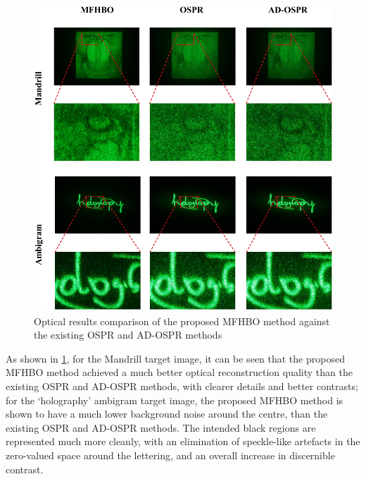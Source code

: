 	\begin{figure}[H]
		\centering
		\includegraphics[width=1.0\textwidth]{recon_quality_vs_OSPR_ADOSPR.pdf}
		\caption{Optical results comparison of the proposed MFHBO method against the existing OSPR and AD-OSPR methods}
		\label{fig:recon_quality_vs_OSPR_ADOSPR}
	\end{figure}

	As shown in \cref{fig:recon_quality_vs_OSPR_ADOSPR}, for the Mandrill target image, it can be seen that the proposed MFHBO method achieved a much better optical reconstruction quality than the existing OSPR and AD-OSPR methods, with clearer details and better contrasts; for the `holography' ambigram target image, the proposed MFHBO method is shown to have a much lower background noise around the centre, than the existing OSPR and AD-OSPR methods. The intended black regions are represented much more cleanly, with an elimination of speckle-like artefacts in the zero-valued space around the lettering, and an overall increase in discernible contrast.

